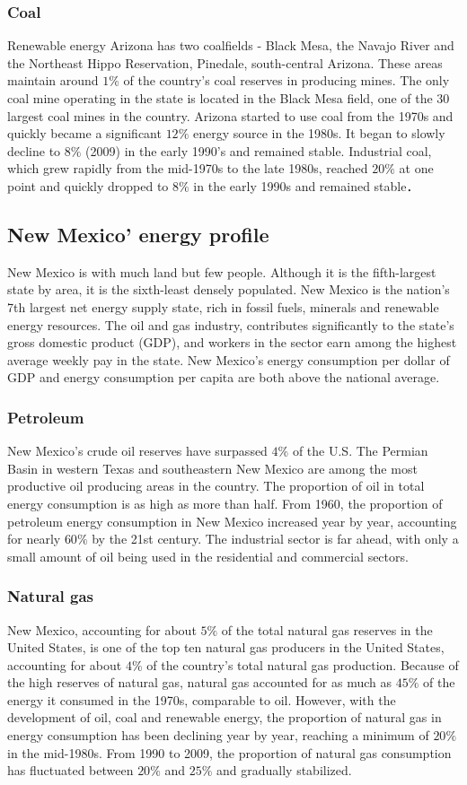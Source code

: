 \documentclass{mcmthesis}
\begin{document}
\subsubsection{Coal}
  Renewable energy Arizona has two coalfields - Black Mesa, the Navajo River and the Northeast Hippo Reservation, Pinedale, south-central Arizona.
  These areas maintain around $1\%$ of the country's coal reserves in producing mines. The only coal mine operating in the state is located in the Black
  Mesa field, one of the 30 largest coal mines in the country. Arizona started to use coal from the 1970s and quickly became a significant $12\%$ energy
  source in the 1980s. It began to slowly decline to $8\%$ (2009) in the early 1990's and remained stable. Industrial coal,
  which grew rapidly from the mid-1970s to the late 1980s, reached $20\%$ at one point and quickly dropped to $8\%$ in the early 1990s and remained stable．
\subsection{New Mexico' energy profile}
New Mexico is with much land but few people. Although it is the fifth-largest state by area, it is the sixth-least densely populated.
New Mexico is the nation's 7th largest net energy supply state, rich in fossil fuels, minerals and renewable energy resources.
The oil and gas industry, contributes significantly to the state's gross domestic product (GDP),
and workers in the sector earn among the highest average weekly pay in the state.
New Mexico's energy consumption per dollar of GDP and energy consumption per capita are both above the national average.
\subsubsection{Petroleum}
  New Mexico's crude oil reserves have surpassed $4\%$ of the U.S. The Permian Basin in western Texas and southeastern New Mexico are among
  the most productive oil producing areas in the country. The proportion of oil in total energy consumption is as high as more than half.
  From 1960, the proportion of petroleum energy consumption in New Mexico increased year by year, accounting for nearly $60\%$ by the 21st century.
  The industrial sector is far ahead, with only a small amount of oil being used in the residential and commercial sectors.
\subsubsection{Natural gas}
  New Mexico, accounting for about $5\%$ of the total natural gas reserves in the United States, is one of the top ten natural gas
  producers in the United States, accounting for about $4\%$ of the country's total natural gas production. Because of the high reserves of
  natural gas, natural gas accounted for as much as $45\%$ of the energy it consumed in the 1970s, comparable to oil.
  However, with the development of oil, coal and renewable energy, the proportion of natural gas in energy consumption has been declining year by year,
  reaching a minimum of $20\%$ in the mid-1980s. From 1990 to 2009, the proportion of natural gas consumption has fluctuated between $20\%$ and $25\%$
   and gradually stabilized.
\end{document}
